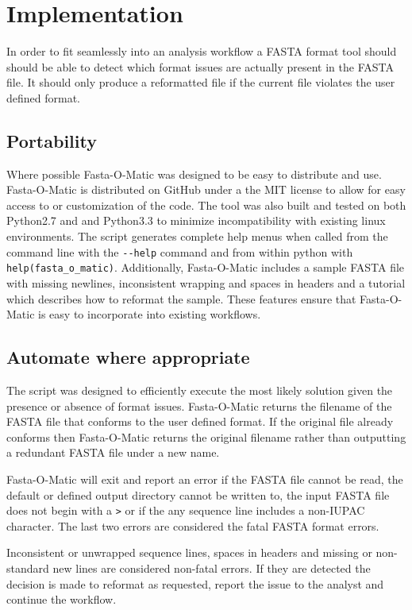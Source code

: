 \section{Implementation}

In order to fit seamlessly into an analysis workflow a FASTA format tool should should be able to detect which format issues are actually present in the FASTA file. It should only produce a reformatted file if the current file violates the user defined format. 


\subsection{Portability}

Where possible Fasta-O-Matic was designed to be easy to distribute and use. Fasta-O-Matic is distributed on GitHub under a the MIT license to allow for easy access to or customization of the code. The tool was also built and tested on both Python2.7 and and Python3.3 to minimize incompatibility with existing linux environments. The script generates complete help menus when called from the command line with the \verb|--help| command and from within python with \verb|help(fasta_o_matic)|. Additionally, Fasta-O-Matic includes a sample FASTA file with missing newlines, inconsistent wrapping and spaces in headers and a tutorial which describes how to reformat the sample. These features ensure that Fasta-O-Matic is easy to incorporate into existing workflows.

\subsection{Automate where appropriate} 

The script was designed to efficiently execute the most likely solution given the presence or absence of format issues. Fasta-O-Matic returns the filename of the FASTA file that conforms to the user defined format. If the original file already conforms then Fasta-O-Matic returns the original filename rather than outputting a redundant FASTA file under a new name.

Fasta-O-Matic will exit and report an error if the FASTA file cannot be read, the default or defined output directory cannot be written to, the input FASTA file does not begin with a \verb|>| or if the any sequence line includes a non-IUPAC character. The last two errors are considered the fatal FASTA format errors.

Inconsistent or unwrapped sequence lines, spaces in headers and missing or non-standard new lines are considered non-fatal errors. If they are detected the decision is made to reformat as requested, report the issue to the analyst and continue the workflow.

